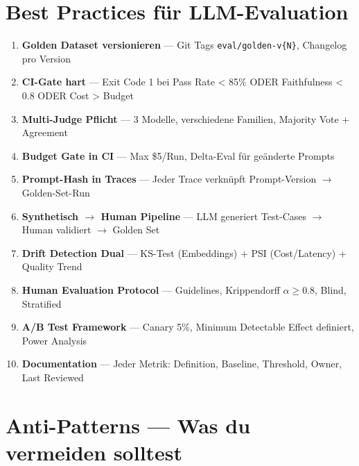 
\section{Best Practices für LLM-Evaluation}

\begin{enumerate}
    \item \textbf{Golden Dataset versionieren} — Git Tags \texttt{eval/golden-v\{N\}}, Changelog pro Version
    \item \textbf{CI-Gate hart} — Exit Code 1 bei Pass Rate < 85\% ODER Faithfulness < 0.8 ODER Cost > Budget
    \item \textbf{Multi-Judge Pflicht} — 3 Modelle, verschiedene Familien, Majority Vote + Agreement
    \item \textbf{Budget Gate in CI} — Max \$5/Run, Delta-Eval für geänderte Prompts
    \item \textbf{Prompt-Hash in Traces} — Jeder Trace verknüpft Prompt-Version $\to$ Golden-Set-Run
    \item \textbf{Synthetisch $\to$ Human Pipeline} — LLM generiert Test-Cases $\to$ Human validiert $\to$ Golden Set
    \item \textbf{Drift Detection Dual} — KS-Test (Embeddings) + PSI (Cost/Latency) + Quality Trend
    \item \textbf{Human Evaluation Protocol} — Guidelines, Krippendorff $\alpha \geq 0.8$, Blind, Stratified
    \item \textbf{A/B Test Framework} — Canary 5\%, Minimum Detectable Effect definiert, Power Analysis
    \item \textbf{Documentation} — Jeder Metrik: Definition, Baseline, Threshold, Owner, Last Reviewed
\end{enumerate}

\section{Anti-Patterns — Was du vermeiden solltest}

